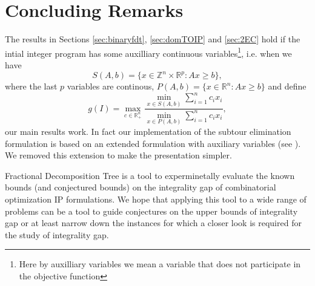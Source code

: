 \section{Concluding Remarks}

The results in Sections \ref{sec:binaryfdt}, \ref{sec:domTOIP} and \ref{sec:2EC} hold if the intial integer program has some auxilliary continuous variables\footnote{Here by auxilliary variables we mean a variable that does not participate in the objective function}, i.e. when we have 
\begin{equation*}
S(A,b) = \{x\in \mathbb{Z}^n\times \mathbb{R}^p: Ax\geq b\},
\end{equation*}
where the last $p$ variables are continous, $P(A,b) = \{x\in \mathbb{R}^n: Ax\geq b\}$ and define
\begin{equation*}
g(I) = \max_{c\in \mathbb{R}^n_+}\frac{\min_{x\in S(A,b)} \sum_{i=1}^{n}c_ix_i}{\min_{x\in P(A,b)} \sum_{i=1}^{n}c_ix_i},
\end{equation*}
our main results work. In fact our implementation of the subtour elimination formulation is based on an extended formulation with auxiliary variables (see \cite{subtour-extended}). We removed this extension to make the presentation simpler.

Fractional Decomposition Tree is a tool to experminetally evaluate the known bounds (and conjectured bounds) on the integrality gap of combinatorial optimization IP formulations. We hope that applying this tool to a wide range of problems can be a tool to guide conjectures on the upper bounds of integrality gap or at least narrow down the instances for which a closer look is required for the study of integrality gap.
